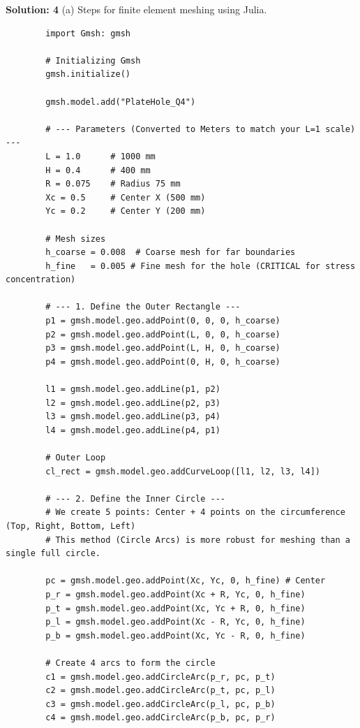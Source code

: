 \documentclass{homework}
\begin{document}
\begin{solution}
    \textbf{Solution: 4}
    (a) Steps for finite element meshing using Julia. 
    \sloppy
    \begin{verbatim}
        import Gmsh: gmsh
        
        # Initializing Gmsh
        gmsh.initialize()
        
        gmsh.model.add("PlateHole_Q4")
        
        # --- Parameters (Converted to Meters to match your L=1 scale) ---
        L = 1.0      # 1000 mm
        H = 0.4      # 400 mm
        R = 0.075    # Radius 75 mm
        Xc = 0.5     # Center X (500 mm)
        Yc = 0.2     # Center Y (200 mm)
        
        # Mesh sizes
        h_coarse = 0.008  # Coarse mesh for far boundaries
        h_fine   = 0.005 # Fine mesh for the hole (CRITICAL for stress concentration)
        
        # --- 1. Define the Outer Rectangle ---
        p1 = gmsh.model.geo.addPoint(0, 0, 0, h_coarse)
        p2 = gmsh.model.geo.addPoint(L, 0, 0, h_coarse)
        p3 = gmsh.model.geo.addPoint(L, H, 0, h_coarse)
        p4 = gmsh.model.geo.addPoint(0, H, 0, h_coarse)
        
        l1 = gmsh.model.geo.addLine(p1, p2)
        l2 = gmsh.model.geo.addLine(p2, p3)
        l3 = gmsh.model.geo.addLine(p3, p4)
        l4 = gmsh.model.geo.addLine(p4, p1)
        
        # Outer Loop
        cl_rect = gmsh.model.geo.addCurveLoop([l1, l2, l3, l4])
        
        # --- 2. Define the Inner Circle ---
        # We create 5 points: Center + 4 points on the circumference (Top, Right, Bottom, Left)
        # This method (Circle Arcs) is more robust for meshing than a single full circle.
        
        pc = gmsh.model.geo.addPoint(Xc, Yc, 0, h_fine) # Center
        p_r = gmsh.model.geo.addPoint(Xc + R, Yc, 0, h_fine)
        p_t = gmsh.model.geo.addPoint(Xc, Yc + R, 0, h_fine)
        p_l = gmsh.model.geo.addPoint(Xc - R, Yc, 0, h_fine)
        p_b = gmsh.model.geo.addPoint(Xc, Yc - R, 0, h_fine)
        
        # Create 4 arcs to form the circle
        c1 = gmsh.model.geo.addCircleArc(p_r, pc, p_t)
        c2 = gmsh.model.geo.addCircleArc(p_t, pc, p_l)
        c3 = gmsh.model.geo.addCircleArc(p_l, pc, p_b)
        c4 = gmsh.model.geo.addCircleArc(p_b, pc, p_r)
        

\end{verbatim}
\end{solution}
\end{document}
